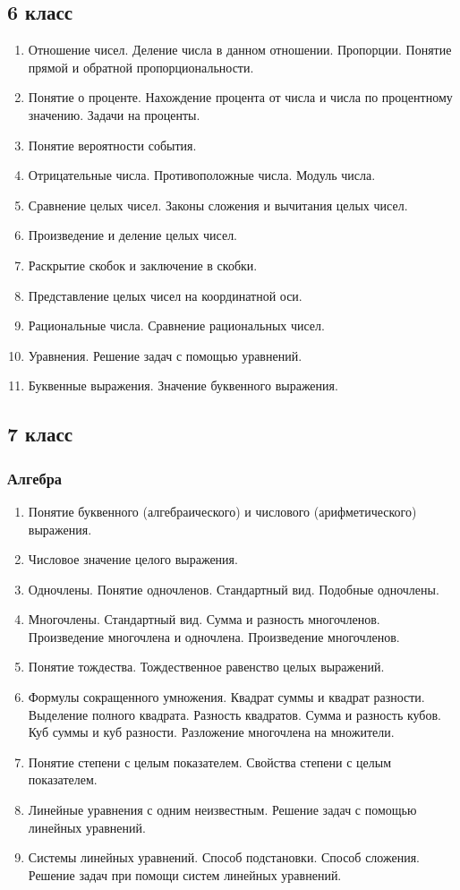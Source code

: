 \documentclass[12pt, a4paper]{article}
\begin{document}
		\subsection*{6 класс}
			\begin{enumerate}[label=\textbf{\arabic*}.]
				\item Отношение чисел. Деление числа в данном отношении. Пропорции. Понятие прямой и обратной пропорциональности.
				\item Понятие о проценте. Нахождение процента от числа и числа по процентному значению. Задачи на проценты.
				\item Понятие вероятности события.
				\item Отрицательные числа. Противоположные числа. Модуль числа.
				\item Сравнение целых чисел. Законы сложения и вычитания целых чисел.
				\item Произведение и деление целых чисел.
				\item Раскрытие скобок и заключение в скобки.
				\item Представление целых чисел на координатной оси.
				\item Рациональные числа. Сравнение рациональных чисел.
				\item Уравнения. Решение задач с помощью уравнений.
				\item Буквенные выражения. Значение буквенного выражения.
			\end{enumerate}
		\subsection*{7 класс}
		\subsubsection*{Алгебра}
			\begin{enumerate}[label=\textbf{\arabic*}.]
				\item Понятие буквенного (алгебраического) и числового (арифметического) выражения.
				\item Числовое значение целого выражения.
				\item Одночлены. Понятие одночленов. Стандартный вид. Подобные одночлены.
				\item Многочлены. Стандартный вид. Сумма и разность многочленов. Произведение многочлена и одночлена. Произведение многочленов.
				\item Понятие тождества. Тождественное равенство целых выражений.
				\item Формулы сокращенного умножения. Квадрат суммы и квадрат разности. Выделение полного квадрата. Разность квадратов. Сумма и разность кубов. Куб суммы и куб разности. Разложение многочлена на множители.
				\item Понятие степени с целым показателем. Свойства степени с целым показателем.
				\item Линейные уравнения с одним неизвестным. Решение задач с помощью линейных уравнений.
				\item Системы линейных уравнений. Способ подстановки. Способ сложения. Решение задач при помощи систем линейных уравнений.
			\end{enumerate}
\end{document}
